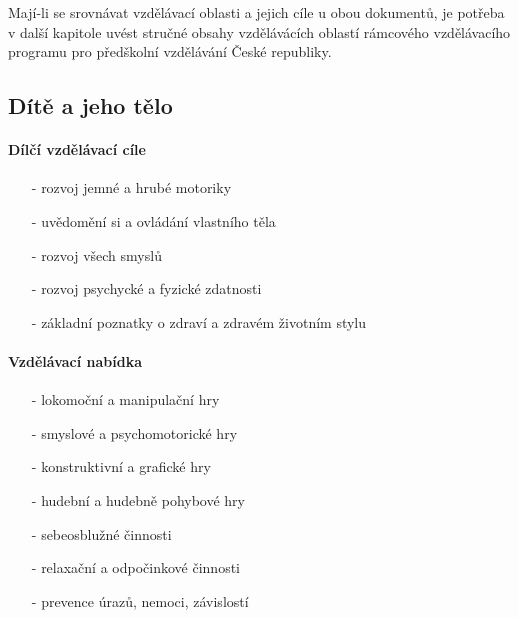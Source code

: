 		Mají-li se srovnávat vzdělávací oblasti a jejich cíle u obou dokumentů, je potřeba v další kapitole uvést stručné obsahy vzdělávácích oblastí rámcového vzdělávacího programu pro předškolní vzdělávání České republiky. 

			\subsection{Dítě a jeho tělo}
				\textit{} \citep[s.~16]{RVP}

				\paragraph{Dílčí vzdělávací cíle} 

				\begin{itemize}
				\setlength\itemsep{-2mm}
					\item[-]rozvoj jemné a hrubé motoriky
					\item[-]uvědomění si a ovládání vlastního těla
					\item[-]rozvoj všech smyslů
					\item[-]rozvoj psychycké a fyzické zdatnosti
					\item[-]základní poznatky o zdraví a zdravém životním stylu
				\end{itemize}

				\paragraph{Vzdělávací nabídka}

				\begin{itemize}
				\setlength\itemsep{-2mm}
					\item[-]lokomoční a manipulační hry
					\item[-]smyslové a psychomotorické hry
					\item[-]konstruktivní a grafické hry
					\item[-]hudební a hudebně pohybové hry
					\item[-]sebeosblužné činnosti
					\item[-]relaxační a odpočinkové činnosti
					\item[-]prevence úrazů, nemoci, závislostí
				\end{itemize}

